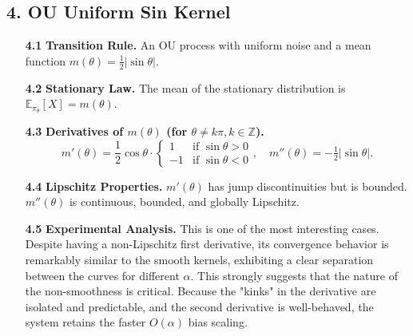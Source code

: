 \documentclass[a4paper]{article}
\begin{document}
\subsection*{4. OU Uniform Sin Kernel}
\begin{itemize}
	\item[\bfseries 4.1] \textbf{Transition Rule.} An OU process with uniform noise and a mean function \( m(\theta)=\tfrac12|\sin\theta| \).
	\item[\bfseries 4.2] \textbf{Stationary Law.} The mean of the stationary distribution is \(\mathbb{E}_{\pi_\theta}[X] = m(\theta)\).
	\item[\bfseries 4.3] \textbf{Derivatives of \(m(\theta)\) (for \(\theta\neq k\pi, k \in \mathbb{Z}\)).}
	\[ m'(\theta)=\frac{1}{2} \cos\theta \cdot
	\begin{cases}
		1 & \text{if } \sin\theta > 0 \\
		-1 & \text{if } \sin\theta < 0
	\end{cases},
	\quad m''(\theta)=-\tfrac12|\sin\theta|.
	\]
	\item[\bfseries 4.4] \textbf{Lipschitz Properties.} \(m'(\theta)\) has jump discontinuities but is bounded. \(m''(\theta)\) is continuous, bounded, and globally Lipschitz.
	\item[\bfseries 4.5] \textbf{Experimental Analysis.} This is one of the most interesting cases. Despite having a non-Lipschitz first derivative, its convergence behavior is remarkably similar to the smooth kernels, exhibiting a clear separation between the curves for different \(\alpha\). This strongly suggests that the nature of the non-smoothness is critical. Because the "kinks" in the derivative are isolated and predictable, and the second derivative is well-behaved, the system retains the faster \(O(\alpha)\) bias scaling.
\end{itemize}
\end{document}
